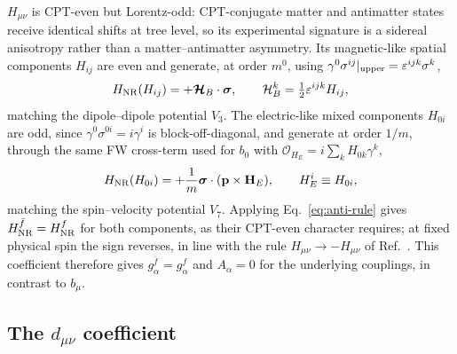 \documentclass[
  aps,
  prd,
  reprint,
  amsmath,
  amssymb,
  nofootinbib,
  superscriptaddress,
  floatfix
]{revtex4-2}
\newcommand{\Aalpha}{A_\alpha}
\newcommand{\sig}{\bm{\sigma}}
\begin{document}
$H_{\mu\nu}$ is CPT-even but Lorentz-odd: CPT-conjugate matter and
antimatter states receive identical shifts at tree level, so its
experimental signature is a sidereal anisotropy rather than a
matter--antimatter asymmetry. Its magnetic-like
spatial components $H_{ij}$ are even and generate, at order $m^0$, using
$\gamma^0\sigma^{ij}|_{\rm upper}=\varepsilon^{ijk}\sigma^k$,
\begin{equation}
  H_{\rm NR}(H_{ij}) = +\bm{\mathcal{H}}_B\cdot\sig ,
  \qquad \mathcal{H}_B^k = \tfrac12\varepsilon^{ijk}H_{ij},
\end{equation}
matching the dipole--dipole potential $V_3$. The electric-like mixed
components $H_{0i}$ are odd, since $\gamma^0\sigma^{0i}=i\gamma^i$ is
block-off-diagonal, and generate at order $1/m$, through the same FW
cross-term used for $b_0$ with $\mathcal{O}_{H_E}=i\sum_k H_{0k}\gamma^k$,
\begin{equation}
  H_{\rm NR}(H_{0i})
  = +\frac{1}{m}\sig\cdot(\mathbf{p}\times\mathbf{H}_E),
  \qquad H_E^i \equiv H_{0i},
\end{equation}
matching the spin--velocity potential $V_7$. Applying
Eq.~\eqref{eq:anti-rule} gives $H^{\bar f}_{\rm NR}=H^{f}_{\rm NR}$ for
both components, as their CPT-even character requires; at fixed physical
spin the sign reverses, in line with the rule $H_{\mu\nu}\to-H_{\mu\nu}$
of Ref.~\cite{KosteleckyLane1999b}. This coefficient therefore gives
$g^{\bar f}_\alpha=g^f_\alpha$ and $\Aalpha=0$ for the underlying
couplings, in contrast to $b_\mu$.

\subsection{The \texorpdfstring{$d_{\mu\nu}$}{d-mu-nu} coefficient}
\end{document}
